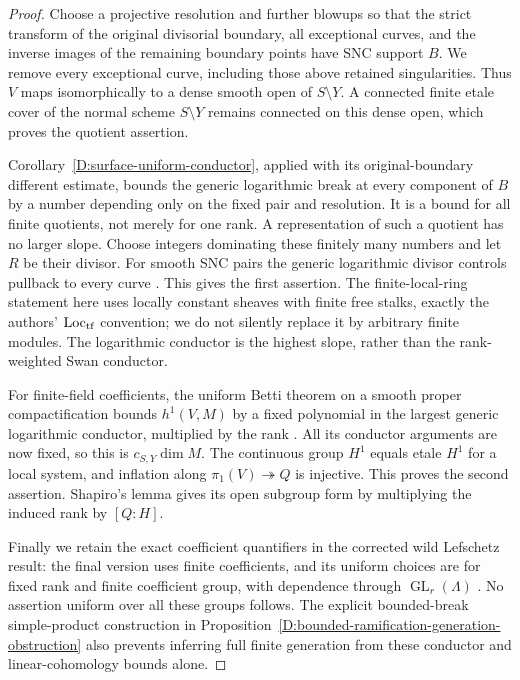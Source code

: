 \begin{proof}
Choose a projective resolution and further blowups so that the strict
transform of the original divisorial boundary, all exceptional curves,
and the inverse images of the remaining boundary points have SNC
support $B$. We remove every exceptional curve, including those above
retained singularities. Thus $V$ maps isomorphically to a dense smooth
open of $S\setminus Y$. A connected finite etale cover of the normal
scheme $S\setminus Y$ remains connected on this dense open, which
proves the quotient assertion.

Corollary~\ref{D:surface-uniform-conductor}, applied with its
original-boundary different estimate, bounds the generic logarithmic
break at every component of $B$ by a number depending only on the
fixed pair and resolution. It is a bound for all finite quotients,
not merely for one rank. A representation of such a quotient has no
larger slope. Choose integers dominating these finitely many numbers
and let $R$ be their divisor. For smooth SNC pairs the generic
logarithmic divisor controls pullback to every curve
\citep[Theorem 3.5, Remark 3.9 and Proposition 5.8(3)]{C_HuTeyssierRam2025}.
This gives the first assertion. The finite-local-ring statement here
uses locally constant sheaves with finite free stalks, exactly the
authors' $\operatorname{Loc}_{\rm tf}$ convention; we do not silently
replace it by arbitrary finite modules. The logarithmic conductor is
the highest slope, rather than the rank-weighted Swan conductor.

For finite-field coefficients, the uniform Betti theorem on a smooth
proper compactification bounds $h^1(V,M)$ by a fixed polynomial in
the largest generic logarithmic conductor, multiplied by the rank
\citep[Theorems 7.15 and 7.34, including the proof of 7.34]{C_HuTeyssierBetti2025}.
All its conductor arguments are now fixed, so this is $c_{S,Y}\dim M$.
The continuous group $H^1$ equals etale $H^1$ for a local system,
and inflation along $\pi_1(V)\twoheadrightarrow Q$ is injective.
This proves the second assertion. Shapiro's lemma gives its open
subgroup form by multiplying the induced rank by $[Q:H]$.

Finally we retain the exact coefficient quantifiers in the corrected
wild Lefschetz result: the final version uses finite coefficients,
and its uniform choices are for fixed rank and finite coefficient
group, with dependence through $\operatorname{GL}_r(\Lambda)$
\citep[Theorems 1.4--1.5; version 3]{C_HuTeyssierLefschetz2026}.
No assertion uniform over all these groups follows. The explicit
bounded-break simple-product construction in
Proposition~\ref{D:bounded-ramification-generation-obstruction}
also prevents inferring full finite generation from these conductor
and linear-cohomology bounds alone.
\end{proof}
